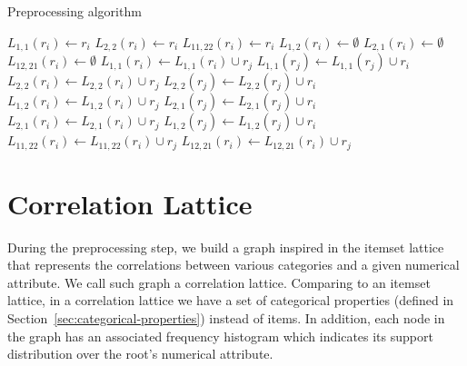 \begin{algorithm}[h!]
  \caption{Preprocessing algorithm}

     {
      $L_{1,1}(r_i) \leftarrow r_i$\;
      $L_{2,2}(r_i) \leftarrow r_i$\;
      $L_{11,22}(r_i) \leftarrow r_i$\;
      $L_{1,2}(r_i) \leftarrow \emptyset$\;
      $L_{2,1}(r_i) \leftarrow \emptyset$\;
      $L_{12,21}(r_i) \leftarrow \emptyset$\;
    }
     {
	 {
	     {
		$L_{1,1}(r_i) \leftarrow L_{1,1}(r_i) \cup r_j$\;
		$L_{1,1}(r_j) \leftarrow L_{1,1}(r_j) \cup r_i$\;
	    }
	     {
		$L_{2,2}(r_i) \leftarrow L_{2,2}(r_i) \cup r_j$\;
		$L_{2,2}(r_j) \leftarrow L_{2,2}(r_j) \cup r_i$\;
	    }
	     {
		$L_{1,2}(r_i) \leftarrow L_{1,2}(r_i) \cup r_j$\;
		$L_{2,1}(r_j) \leftarrow L_{2,1}(r_j) \cup r_i$\;
	    }
	     {
		$L_{2,1}(r_i) \leftarrow L_{2,1}(r_i) \cup r_j$\;
		$L_{1,2}(r_j) \leftarrow L_{1,2}(r_j) \cup r_i$\;
	    }
	}
   }
    {
	 {
	     {
		$L_{11,22}(r_i) \leftarrow L_{11,22}(r_i) \cup r_j$\;
	    }
	}
	 {
	     {
		$L_{12,21}(r_i) \leftarrow L_{12,21}(r_i) \cup r_j$\;
	    }
	}
   }
  \label{alg3}
\end{algorithm}

\section{Correlation Lattice}
\label{sec:correlation-lattice}

During the preprocessing step, we build a graph inspired in the itemset lattice that represents the
correlations between various categories and a given numerical attribute. We call such graph a
correlation lattice.
Comparing to an itemset lattice, in a correlation lattice we have a set of categorical properties (defined in
Section~\ref{sec:categorical-properties}) instead of items. In addition, each node in the graph has an associated
frequency histogram which indicates its support distribution over the root's numerical attribute.

